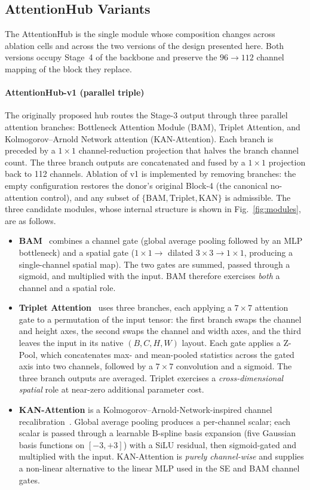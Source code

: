 \subsection{AttentionHub Variants}\label{ssec:hub}

The AttentionHub is the single module whose composition changes across
ablation cells and across the two versions of the design presented here.
Both versions occupy Stage~4 of the backbone and preserve the
$96 \rightarrow 112$ channel mapping of the block they replace.

\paragraph{AttentionHub-v1 (parallel triple)}
The originally proposed hub routes the Stage-3 output through three parallel
attention branches: Bottleneck Attention Module (BAM), Triplet Attention,
and Kolmogorov--Arnold Network attention (KAN-Attention). Each branch is preceded
by a $1\times1$ channel-reduction projection that halves the branch channel
count. The three branch outputs are concatenated and fused by a $1\times1$
projection back to 112 channels. Ablation of v1 is implemented by removing
branches: the empty configuration restores the donor's original Block-4
(the canonical no-attention control), and any subset of
$\{\text{BAM},\text{Triplet},\text{KAN}\}$ is admissible. The three
candidate modules, whose internal structure is shown in
Fig.~\ref{fig:modules}, are as follows.

\begin{itemize}
  \item \textbf{BAM}~\cite{park2018bam} combines a channel gate (global
  average pooling followed by an MLP bottleneck) and a spatial gate
  ($1\times1 \rightarrow$ dilated $3\times3 \rightarrow 1\times1$, producing
  a single-channel spatial map). The two gates are summed, passed through a
  sigmoid, and multiplied with the input. BAM therefore exercises
  \emph{both} a channel and a spatial role.
  \item \textbf{Triplet Attention}~\cite{misra2021triplet} uses three
  branches, each applying a $7\times7$ attention gate to a permutation of
  the input tensor: the first branch swaps the channel and height axes, the
  second swaps the channel and width axes, and the third leaves the input
  in its native $(B,C,H,W)$ layout. Each gate applies a Z-Pool, which
  concatenates max- and mean-pooled statistics across the gated axis into
  two channels, followed by a $7\times7$ convolution and a sigmoid. The
  three branch outputs are averaged. Triplet exercises a
  \emph{cross-dimensional spatial} role at near-zero additional parameter
  cost.
  \item \textbf{KAN-Attention} is a Kolmogorov--Arnold-Network-inspired
  channel recalibration~\cite{liu2024kan}. Global average pooling produces
  a per-channel scalar; each scalar is passed through a learnable B-spline
  basis expansion (five Gaussian basis functions on $[-3,+3]$) with a SiLU
  residual, then sigmoid-gated and multiplied with the input. KAN-Attention
  is \emph{purely channel-wise} and supplies a non-linear alternative to the
  linear MLP used in the SE and BAM channel gates.
\end{itemize}

